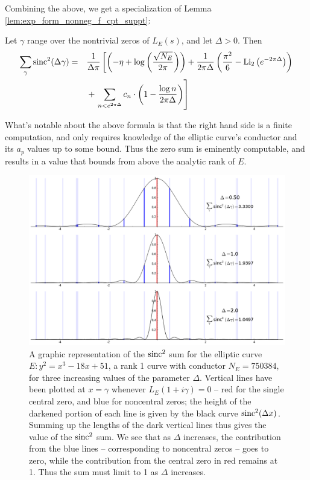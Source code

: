 Combining the above, we get a specialization of Lemma \ref{lem:exp_form_nonneg_f_cpt_suppt}:
\begin{corollary}
Let $\gamma$ range over the nontrivial zeros of $L_E(s)$, and let $\Delta > 0$. Then
\begin{align}\label{eqn:sincsquared_sum}
\sum_{\gamma} \text{sinc}^2(\Delta \gamma) = \quad &\frac{1}{\Delta \pi}\left[\left(-\eta + \log\left(\frac{\sqrt{N_E}}{2\pi}\right)\right)+ \frac{1}{2\pi \Delta}\left(\frac{\pi^2}{6} - \text{Li}_2\left(e^{-2\pi \Delta}\right)\right)  \right. \nonumber \\
&+ \left.\sum_{n<e^{2\pi \Delta}} c_n \cdot \left(1-\frac{\log n}{2\pi \Delta}\right)\right]
\end{align}
\end{corollary}

What's notable about the above formula is that the right hand side is a finite computation, and only requires knowledge of the elliptic curve's conductor and its $a_p$ values up to some bound. Thus the zero sum is eminently computable, and results in a value that bounds from above the analytic rank of $E$. \\

\begin{figure}[!h]
    \centering
    \includegraphics[width=1.0\textwidth]{graphics/zero_sum_visualization.png}
    \caption{A graphic representation of the $\text{sinc}^2$ sum for the elliptic curve $E: y^2=x^3-18x+51$, a rank 1 curve with conductor $N_E=750384$, for three increasing values of the parameter $\Delta$. Vertical lines have been plotted at $x=\gamma$ whenever $L_E(1+i\gamma)=0$ -- red for the single central zero, and blue for noncentral zeros; the height of the darkened portion of each line is given by the black curve $\text{sinc}^2(\Delta x)$. Summing up the lengths of the dark vertical lines thus gives the value of the $\text{sinc}^2$ sum. We see that as $\Delta$ increases, the contribution from the blue lines -- corresponding to noncentral zeros -- goes to zero, while the contribution from the central zero in red remains at 1. Thus the sum must limit to 1 as $\Delta$ increases.}
    \label{fig:zero_sum_visualization}
\end{figure}


